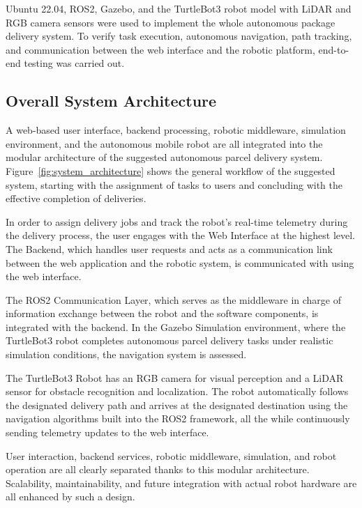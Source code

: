 Ubuntu 22.04, ROS2, Gazebo, and the TurtleBot3 robot model with LiDAR and RGB camera sensors were used to implement the whole autonomous package delivery system. To verify task execution, autonomous navigation, path tracking, and communication between the web interface and the robotic platform, end-to-end testing was carried out.



\subsection{Overall System Architecture}

A web-based user interface, backend processing, robotic middleware, simulation environment, and the autonomous mobile robot are all integrated into the modular architecture of the suggested autonomous parcel delivery system. Figure~\ref{fig:system_architecture} shows the general workflow of the suggested system, starting with the assignment of tasks to users and concluding with the effective completion of deliveries.

In order to assign delivery jobs and track the robot's real-time telemetry during the delivery process, the user engages with the Web Interface at the highest level. The Backend, which handles user requests and acts as a communication link between the web application and the robotic system, is communicated with using the web interface.

The ROS2 Communication Layer, which serves as the middleware in charge of information exchange between the robot and the software components, is integrated with the backend. In the Gazebo Simulation environment, where the TurtleBot3 robot completes autonomous parcel delivery tasks under realistic simulation conditions, the navigation system is assessed.

The TurtleBot3 Robot has an RGB camera for visual perception and a LiDAR sensor for obstacle recognition and localization. The robot automatically follows the designated delivery path and arrives at the designated destination using the navigation algorithms built into the ROS2 framework, all the while continuously sending telemetry updates to the web interface.

User interaction, backend services, robotic middleware, simulation, and robot operation are all clearly separated thanks to this modular architecture. Scalability, maintainability, and future integration with actual robot hardware are all enhanced by such a design.


